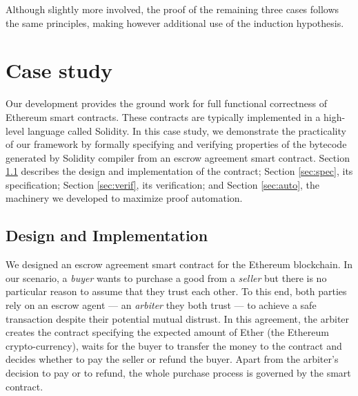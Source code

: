 \documentclass[sigplan,10pt]{acmart}\settopmatter{printfolios=true,printccs=false,printacmref=false}
\begin{document}
Although slightly more involved, the proof of the remaining three cases follows the
same principles,
making however additional use of the induction hypothesis.
%
\section{Case study}
\label{sec:case}



Our development provides the ground work for full functional correctness
of Ethereum smart contracts.
These contracts are typically implemented in a high-level
language called Solidity.
In this case study, we demonstrate the practicality of our framework
by formally specifying and verifying properties of the bytecode 
generated by Solidity compiler from an escrow agreement smart contract.
Section \ref{sec:design} describes the design and implementation of
the contract; Section \ref{sec:spec}, its specification;
Section \ref{sec:verif}, its verification;
and Section \ref{sec:auto}, the machinery we developed
to maximize proof automation.

\subsection{Design and Implementation}
\label{sec:design}
%
We designed an escrow agreement smart contract for the Ethereum blockchain.
In our scenario, a \textit{buyer} wants to purchase a good from a \textit{seller}
but there is no particular reason to assume that they trust each other.
To this end, both parties rely on an
escrow agent --- an \textit{arbiter} they both trust --- to achieve
a safe transaction despite their potential mutual distrust.
In this agreement, the arbiter creates the contract specifying the
expected amount of Ether (the Ethereum crypto-currency), waits for the buyer to transfer the money to
the contract and decides whether to pay the seller or refund the buyer.
Apart from the arbiter's decision to pay or to refund, the whole purchase process
is governed by the smart contract.
\end{document}
